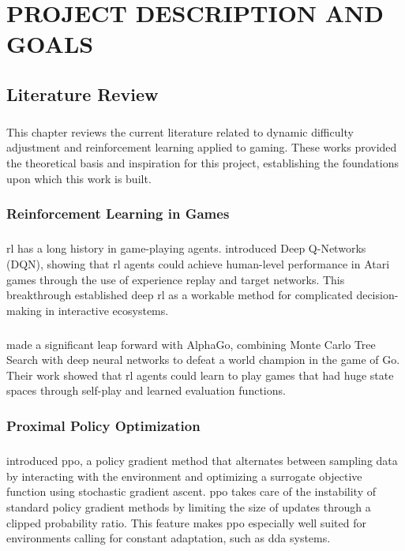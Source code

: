 \chapter{\MakeUppercase{Project Description and Goals}}
\justifying
\section{Literature Review}
\paragraph{} This chapter reviews the current literature related to dynamic difficulty adjustment and reinforcement learning applied to gaming. These works provided the theoretical basis and inspiration for this project, establishing the foundations upon which this work is built.

\subsection{Reinforcement Learning in Games}
\paragraph{} \ac{rl} has a long history in game-playing agents. \citet{mnih2015human} introduced Deep Q-Networks (DQN), showing that \ac{rl} agents could achieve human-level performance in Atari games through the use of experience replay and target networks. This breakthrough established deep \ac{rl} as a workable method for complicated decision-making in interactive ecosystems.

\paragraph{} \citet{silver2016mastering} made a significant leap forward with AlphaGo, combining Monte Carlo Tree Search with deep neural networks to defeat a world champion in the game of Go. Their work showed that \ac{rl} agents could learn to play games that had huge state spaces through self-play and learned evaluation functions.

\subsection{Proximal Policy Optimization}
\paragraph{} \citet{schulman2017proximal} introduced \ac{ppo}, a policy gradient method that alternates between sampling data by interacting with the environment and optimizing a surrogate objective function using stochastic gradient ascent. \ac{ppo} takes care of the instability of standard policy gradient methods by limiting the size of updates through a clipped probability ratio. This feature makes \ac{ppo} especially well suited for environments calling for constant adaptation, such as \ac{dda} systems.
